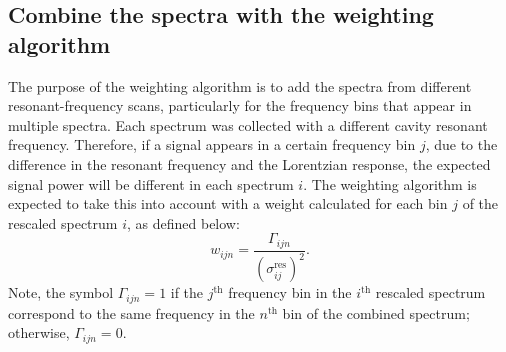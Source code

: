 


\subsection{Combine the spectra with the weighting algorithm} 
\label{sec:weighting_algorithm}

The purpose of the weighting algorithm is to add the spectra from different 
resonant-frequency scans,
 particularly for the frequency bins that appear in multiple spectra.  
Each spectrum was collected with a different cavity resonant frequency. 
Therefore, if a signal appears in a certain frequency bin $j$, due to the
 difference in the resonant frequency and the Lorentzian response, the 
expected signal
 power will be different in each spectrum $i$. The weighting algorithm is 
expected to take this into account with a weight calculated for each bin $j$ of
 the rescaled spectrum $i$, as defined below: %
\begin{equation}
    \label{eq:weight}
    {w_{ijn}} = \frac{\Gamma_{ijn}}{(\sigma_{ij}^\text{res})^{2}}.
\end{equation}
Note, the symbol $\Gamma_{ijn}=1$ if the $j^\text{th}$ frequency bin in the 
$i^\text{th}$ rescaled spectrum correspond to the same frequency in 
the $n^\text{th}$ bin of the combined spectrum; otherwise, $\Gamma_{ijn}=0$.

